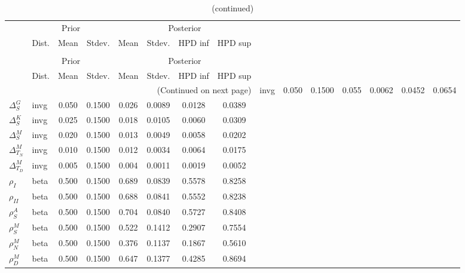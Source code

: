  
\begin{center}
\begin{longtable}{llcccccc} 
\caption{Results from Metropolis-Hastings (parameters)}
 \label{Table:MHPosterior:1}\\
\toprule 
  & \multicolumn{3}{c}{Prior}  &  \multicolumn{4}{c}{Posterior} \\
  \cmidrule(r{.75em}){2-4} \cmidrule(r{.75em}){5-8}
  & Dist. & Mean  & Stdev. & Mean & Stdev. & HPD inf & HPD sup\\
\midrule \endfirsthead 
\caption{(continued)}\\\toprule 
  & \multicolumn{3}{c}{Prior}  &  \multicolumn{4}{c}{Posterior} \\
  \cmidrule(r{.75em}){2-4} \cmidrule(r{.75em}){5-8}
  & Dist. & Mean  & Stdev. & Mean & Stdev. & HPD inf & HPD sup\\
\midrule \endhead 
\bottomrule \multicolumn{8}{r}{(Continued on next page)} \endfoot 
\bottomrule \endlastfoot 
${\Delta^{A}_{S}}$ & invg &   0.050 & 0.1500 &   0.055& 0.0062 &  0.0452 &  0.0654 \\ 
${\Delta^{G}_{S}}$ & invg &   0.050 & 0.1500 &   0.026& 0.0089 &  0.0128 &  0.0389 \\ 
${\Delta^{K}_{S}}$ & invg &   0.025 & 0.1500 &   0.018& 0.0105 &  0.0060 &  0.0309 \\ 
${\Delta^{M}_{S}}$ & invg &   0.020 & 0.1500 &   0.013& 0.0049 &  0.0058 &  0.0202 \\ 
${\Delta^{M}_{T_N}}$ & invg &   0.010 & 0.1500 &   0.012& 0.0034 &  0.0064 &  0.0175 \\ 
${\Delta^{M}_{T_D}}$ & invg &   0.005 & 0.1500 &   0.004& 0.0011 &  0.0019 &  0.0052 \\ 
${\rho_{I}}$ & beta &   0.500 & 0.1500 &   0.689& 0.0839 &  0.5578 &  0.8258 \\ 
${\rho_{II}}$ & beta &   0.500 & 0.1500 &   0.688& 0.0841 &  0.5552 &  0.8238 \\ 
${\rho^{A}_{S}}$ & beta &   0.500 & 0.1500 &   0.704& 0.0840 &  0.5727 &  0.8408 \\ 
${\rho^{M}_{S}}$ & beta &   0.500 & 0.1500 &   0.522& 0.1412 &  0.2907 &  0.7554 \\ 
${\rho^{M}_{N}}$ & beta &   0.500 & 0.1500 &   0.376& 0.1137 &  0.1867 &  0.5610 \\ 
${\rho^{M}_{D}}$ & beta &   0.500 & 0.1500 &   0.647& 0.1377 &  0.4285 &  0.8694 \\ 
\end{longtable}
 \end{center}
